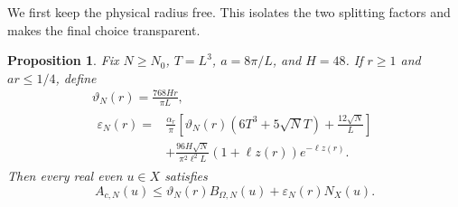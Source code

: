 \documentclass[11pt]{article}
\newtheorem{proposition}[theorem]{Proposition}
\theoremstyle{remark}\newtheorem{remark}[theorem]{Remark}
\newcommand{\NX}{N_X}
\numberwithin{equation}{section}
\begin{document}
We first keep the physical radius free. This isolates the two splitting factors and makes the final choice transparent.
\begin{proposition}\label{prop:general}
Fix $N\ge N_0$, $T=L^3$, $a=8\pi/L$, and $H=48$. If $r\ge1$ and $ar\le1/4$, define
\begin{gather}
 \vartheta_N(r)=\frac{768Hr}{\pi L},\label{eq:generaltheta}\\
 \begin{split}
 \varepsilon_N(r)={}&\frac{\alpha_r}{\pi}
 \left[\vartheta_N(r)(6T^3+5\sqrt N T)+\frac{12\sqrt N}{L}\right]\\
 &+\frac{96H\sqrt N}{\pi^2\ell^2L}
                  (1+\ell z(r))e^{-\ell z(r)}.
 \end{split}\label{eq:generalerror}
\end{gather}
Then every real even $u\in X$ satisfies
\begin{equation}\label{eq:generalresult}
 A_{c,N}(u)\le\vartheta_N(r)B_{\Omega,N}(u)+\varepsilon_N(r)\NX(u).
\end{equation}
\end{proposition}
\end{document}
